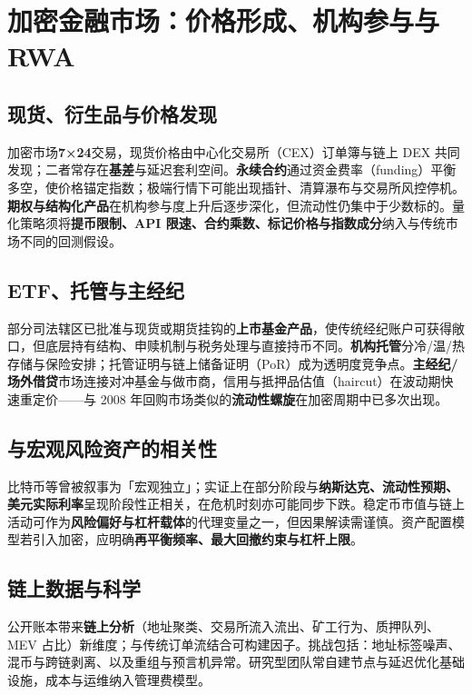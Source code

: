 \chapter{加密金融市场：价格形成、机构参与与 RWA}

\section{现货、衍生品与价格发现}

加密市场\textbf{7×24}交易，现货价格由中心化交易所（CEX）订单簿与链上 DEX 共同发现；二者常存在\textbf{基差}与延迟套利空间。\textbf{永续合约}通过资金费率（funding）平衡多空，使价格锚定指数；极端行情下可能出现插针、清算瀑布与交易所风控停机。\textbf{期权与结构化产品}在机构参与度上升后逐步深化，但流动性仍集中于少数标的。量化策略须将\textbf{提币限制、API 限速、合约乘数、标记价格与指数成分}纳入与传统市场不同的回测假设。

\section{ETF、托管与主经纪}

部分司法辖区已批准与现货或期货挂钩的\textbf{上市基金产品}，使传统经纪账户可获得敞口，但底层持有结构、申赎机制与税务处理与直接持币不同。\textbf{机构托管}分冷/温/热存储与保险安排；托管证明与链上储备证明（PoR）成为透明度竞争点。\textbf{主经纪/场外借贷}市场连接对冲基金与做市商，信用与抵押品估值（haircut）在波动期快速重定价——与 2008 年回购市场类似的\textbf{流动性螺旋}在加密周期中已多次出现。

\section{与宏观风险资产的相关性}

比特币等曾被叙事为「宏观独立」；实证上在部分阶段与\textbf{纳斯达克、流动性预期、美元实际利率}呈现阶段性正相关，在危机时刻亦可能同步下跌。稳定币市值与链上活动可作为\textbf{风险偏好与杠杆载体}的代理变量之一，但因果解读需谨慎。资产配置模型若引入加密，应明确\textbf{再平衡频率、最大回撤约束与杠杆上限}。

\section{链上数据与科学}

公开账本带来\textbf{链上分析}（地址聚类、交易所流入流出、矿工行为、质押队列、MEV 占比）新维度；与传统订单流结合可构建因子。挑战包括：地址标签噪声、混币与跨链剥离、以及重组与预言机异常。研究型团队常自建节点与延迟优化基础设施，成本与运维纳入管理费模型。

